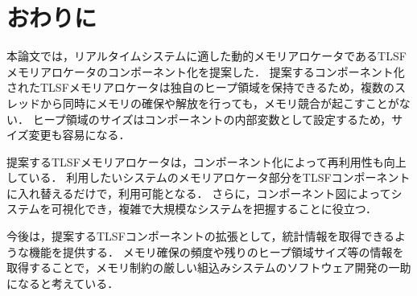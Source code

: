 \documentclass[submit,techrep]{ipsj_v2/UTF8/ipsj}
\begin{document}

\section{おわりに}
\label{sec:Conclusion}

本論文では，リアルタイムシステムに適した動的メモリアロケータであるTLSFメモリアロケータのコンポーネント化を提案した．
提案するコンポーネント化されたTLSFメモリアロケータは独自のヒープ領域を保持できるため，複数のスレッドから同時にメモリの確保や解放を行っても，メモリ競合が起こすことがない．
ヒープ領域のサイズはコンポーネントの内部変数として設定するため，サイズ変更も容易になる．

提案するTLSFメモリアロケータは，コンポーネント化によって再利用性も向上している．
利用したいシステムのメモリアロケータ部分をTLSFコンポーネントに入れ替えるだけで，利用可能となる．
さらに，コンポーネント図によってシステムを可視化でき，複雑で大規模なシステムを把握することに役立つ．

今後は，提案するTLSFコンポーネントの拡張として，統計情報を取得できるような機能を提供する．
メモリ確保の頻度や残りのヒープ領域サイズ等の情報を取得することで，メモリ制約の厳しい組込みシステムのソフトウェア開発の一助になると考えている．




\end{document}
